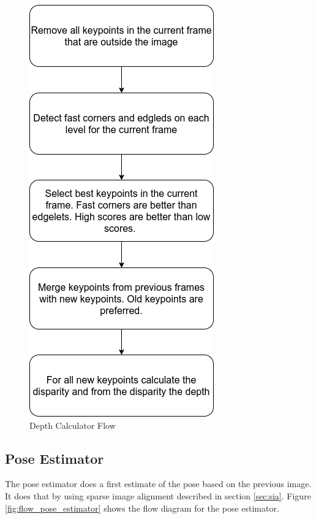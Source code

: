\documentclass[11pt,a4paper,titlepage,oneside]{report}
\begin{document}
\begin{figure}[H]
  \centering
  \includegraphics[scale=0.3]{img/flow_depth_calculator.png}
  \caption{Depth Calculator Flow}\label{fig:flow_depth_calculator}
\end{figure}

\subsection{Pose Estimator}

The pose estimator does a first estimate of the pose based on the previous image. It does that by using sparse image alignment described in section \ref{sec:sia}. Figure \ref{fig:flow_pose_estimator} shows the flow diagram for the pose estimator.
\end{document}
